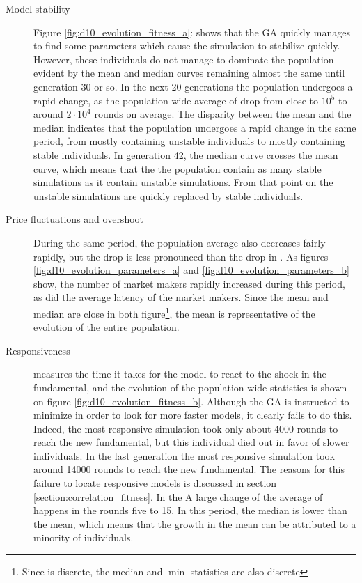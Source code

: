 \begin{description}
\item[Model stability]
Figure \ref{fig:d10_evolution_fitness_a}: shows that  the GA quickly manages to find some parameters which cause the simulation to stabilize quickly. However, these individuals do not manage to dominate the population evident by the mean and median curves remaining almost the same until generation 30 or so. In the next 20 generations the population undergoes a rapid change, as the population wide average of \roundstable drop from close to $10^5$ to around $2\cdot 10^4$ rounds on average. The disparity between the mean and the median indicates that the population undergoes a rapid change in the same period, from mostly containing unstable individuals to mostly containing stable individuals. In generation 42, the median curve crosses the mean curve, which means that the the population contain as many stable simulations as it contain unstable simulations. From that point on the unstable simulations are quickly replaced by stable individuals.
\item[Price fluctuations and overshoot]
During the same period, the population average \stdev also decreases fairly rapidly, but the drop is less pronounced than the drop in \stdev. As figures \ref{fig:d10_evolution_parameters_a} and \ref{fig:d10_evolution_parameters_b} show, the number of market makers rapidly increased during this period, as did the average latency of the market makers. Since the mean and median are close in both figure\footnote{Since \overshoot is discrete, the median and $\min$ statistics are also discrete}, the mean is representative of the evolution of the entire population.
\item[Responsiveness]
\timetoreachnewfundamental measures the time it takes for the model to react to the shock in the fundamental, and the evolution of the population wide statistics is shown on figure \ref{fig:d10_evolution_fitness_b}. Although the GA is instructed to minimize \timetoreachnewfundamental in order to look for more faster models, it clearly fails to do this. Indeed, the most responsive simulation took only about 4000 rounds to reach the new fundamental, but this individual died out in favor of slower individuals. In the last generation the most responsive simulation took around 14000 rounds to reach the new fundamental. The reasons for this failure to locate responsive models is discussed in section \ref{section:correlation_fitness}. In the A large change of the average of \timetoreachnewfundamental happens in the rounds five to 15. In this period, the median is lower than the mean, which means that the growth in the mean can be attributed to a minority of individuals.
\end{description}


